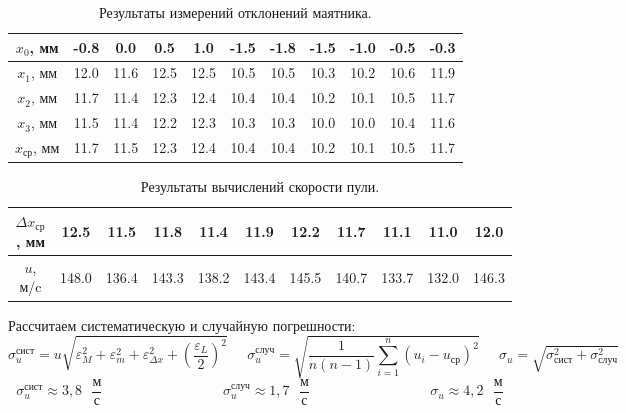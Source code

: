 \documentclass[
	a4paper, %
	12pt, %
]{article}
\begin{document}
	\begin{table}[h]
		\centering
		\begin{tabular}[H]{|c|c|c|c|c|c|c|c|c|c|c|}
			\hline
			$x_0$, мм & -0.8 & 0.0 & 0.5 & 1.0 & -1.5 & -1.8 & -1.5 & -1.0 & -0.5 & -0.3  \\
			\hline
			$x_1$, мм & 12.0 & 11.6 & 12.5 & 12.5 & 10.5 & 10.5 & 10.3 & 10.2 & 10.6 & 11.9  \\
			\hline
			$x_2$, мм & 11.7 & 11.4 & 12.3 & 12.4 & 10.4 & 10.4 & 10.2 & 10.1 & 10.5 & 11.7  \\
			\hline
			$x_3$, мм & 11.5 & 11.4 & 12.2 & 12.3 & 10.3 & 10.3 & 10.0 & 10.0 & 10.4 & 11.6  \\
			\hline
			$x_{\text{ср}}$, мм & 11.7 & 11.5 & 12.3 & 12.4 & 10.4 & 10.4 & 10.2 & 10.1 & 10.5 & 11.7  \\
			\hline
		\end{tabular}
		\caption{Результаты измерений отклонений маятника.}
		\label{table:2}
	\end{table}
	\begin{table}[h]
		\centering
		\begin{tabular}[H]{|c|c|c|c|c|c|c|c|c|c|c|}
			\hline
			$\Delta x_{\text{ср}}$, мм & 12.5 & 11.5 & 11.8 & 11.4 & 11.9 & 12.2 & 11.7 & 11.1 & 11.0 & 12.0  \\
			\hline
			$u$, м/c & 148.0 & 136.4 & 143.3 & 138.2 & 143.4  & 145.5 & 140.7 & 133.7 & 132.0 & 146.3  \\
			\hline
		\end{tabular}
		\caption{Результаты вычислений скорости пули.}
		\label{table:3}
	\end{table}
	
	\newpage
	
	Рассчитаем систематическую и случайную погрешности:
	\begin{equation}
		\sigma_u^{\text{сист}} =u \sqrt{\varepsilon_M^2 + \varepsilon_m^2 + \varepsilon_{\Delta x}^2 + \left(\frac{\varepsilon_L}{2} \right)^2}  \;\;\;\;\; \sigma_u^{\text{случ}} = \sqrt{ \frac{1}{n(n-1)} \sum_{i=1}^{n}(u_i - u_{\text{ср}})^2} \;\;\;\;\; \sigma_u =\sqrt{\sigma_{\text{сист}}^2 + \sigma_\text{случ}^2} 
	\end{equation}
	\begin{equation}
		\sigma_u^\text{сист}\approx 3,8 \text{ }\dfrac{\text{м}}{\text{с}} \;\;\;\;\;\;\;\;\;\;\;\;\;\;\;\;\;\;\;\;\;\;\;\;\;\;\;\;\;\;\; \sigma_u^\text{случ}\approx 1,7 \text{ }\dfrac{\text{м}}{\text{с}} \;\;\;\;\;\;\;\;\;\;\;\;\;\;\;\;\;\;\;\;\;\;\;\;\;\;\;\;\;\;\;
\sigma_u \approx 4,2 \text{ }\dfrac{\text{м}}{\text{с}}
	\end{equation}
	
\end{document}
